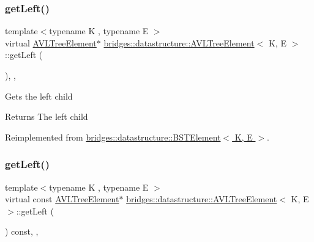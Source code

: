 \subsubsection{\texorpdfstring{get\+Left()}{getLeft()}\hspace{0.1cm}{\footnotesize\ttfamily [1/2]}}
{\footnotesize\ttfamily template$<$typename K , typename E $>$ \\
virtual \hyperlink{classbridges_1_1datastructure_1_1_a_v_l_tree_element}{A\+V\+L\+Tree\+Element}$\ast$ \hyperlink{classbridges_1_1datastructure_1_1_a_v_l_tree_element}{bridges\+::datastructure\+::\+A\+V\+L\+Tree\+Element}$<$ K, E $>$\+::get\+Left (\begin{DoxyParamCaption}{ }\end{DoxyParamCaption})\hspace{0.3cm}{\ttfamily [inline]}, {\ttfamily [override]}, {\ttfamily [virtual]}}

Gets the left child \begin{DoxyReturn}{Returns}
The left child 
\end{DoxyReturn}


Reimplemented from \hyperlink{classbridges_1_1datastructure_1_1_b_s_t_element_af863c624691c11db26ae3b6d723d1f5c}{bridges\+::datastructure\+::\+B\+S\+T\+Element$<$ K, E $>$}.

\mbox{\label{classbridges_1_1datastructure_1_1_a_v_l_tree_element_a4a639e0c623435aadf5c51ed132cb25d}} 
\subsubsection{\texorpdfstring{get\+Left()}{getLeft()}\hspace{0.1cm}{\footnotesize\ttfamily [2/2]}}
{\footnotesize\ttfamily template$<$typename K , typename E $>$ \\
virtual const \hyperlink{classbridges_1_1datastructure_1_1_a_v_l_tree_element}{A\+V\+L\+Tree\+Element}$\ast$ \hyperlink{classbridges_1_1datastructure_1_1_a_v_l_tree_element}{bridges\+::datastructure\+::\+A\+V\+L\+Tree\+Element}$<$ K, E $>$\+::get\+Left (\begin{DoxyParamCaption}{ }\end{DoxyParamCaption}) const\hspace{0.3cm}{\ttfamily [inline]}, {\ttfamily [override]}, {\ttfamily [virtual]}}

